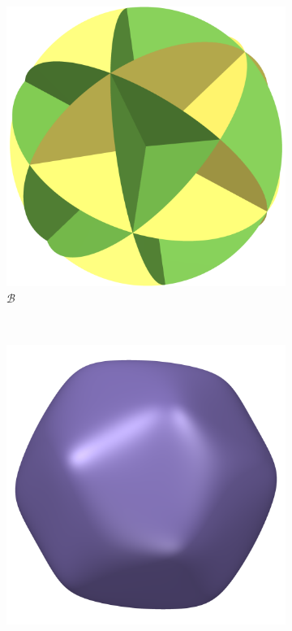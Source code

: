 \documentclass{article}
\begin{document}
    \begin{figure}[h]
        \centering
        \begin{subfigure}[t]{0.2\textwidth}
            \includegraphics[width=\textwidth]{pictures/construction_one.png}
            \caption{$\mathcal{B}$}
            \label{fig:construction_one}
        \end{subfigure}
        ~
        \begin{subfigure}[t]{0.2\textwidth}
            \includegraphics[width=\textwidth]{pictures/construction_1_5.png}

\end{subfigure}
\end{figure}
\end{document}
